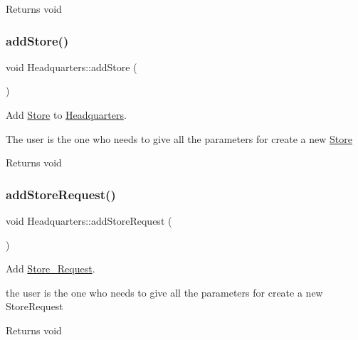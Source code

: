 \begin{DoxyReturn}{Returns}
void 
\end{DoxyReturn}
\mbox{\label{class_headquarters_ab0fa0fad9679f2f99811257d5a49f4c0}} 
\subsubsection{\texorpdfstring{add\+Store()}{addStore()}}
{\footnotesize\ttfamily void Headquarters\+::add\+Store (\begin{DoxyParamCaption}{ }\end{DoxyParamCaption})}



Add \hyperlink{class_store}{Store} to \hyperlink{class_headquarters}{Headquarters}. 

The user is the one who needs to give all the parameters for create a new \hyperlink{class_store}{Store}

\begin{DoxyReturn}{Returns}
void 
\end{DoxyReturn}
\mbox{\label{class_headquarters_a260cfd15b81cd073a2b597ac892a2142}} 
\subsubsection{\texorpdfstring{add\+Store\+Request()}{addStoreRequest()}}
{\footnotesize\ttfamily void Headquarters\+::add\+Store\+Request (\begin{DoxyParamCaption}{ }\end{DoxyParamCaption})}



Add \hyperlink{class_store___request}{Store\+\_\+\+Request}. 

the user is the one who needs to give all the parameters for create a new Store\+Request

\begin{DoxyReturn}{Returns}
void 
\end{DoxyReturn}
\mbox{\label{class_headquarters_ad162fb3833c24833a0ac83b50f3df91b}} 
